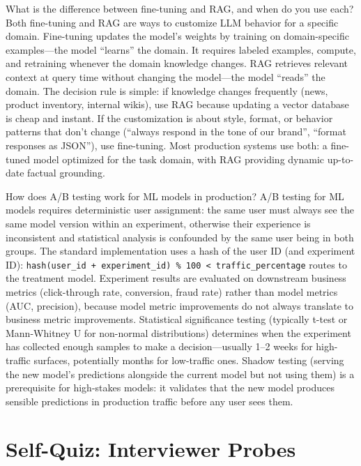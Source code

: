 \documentclass[11pt,a4paper]{article}
\begin{document}
\begin{curiobox}{What is the difference between fine-tuning and RAG, and when do you use each?}
Both fine-tuning and RAG are ways to customize LLM behavior for a specific domain. Fine-tuning updates the model's weights by training on domain-specific examples---the model ``learns'' the domain. It requires labeled examples, compute, and retraining whenever the domain knowledge changes. RAG retrieves relevant context at query time without changing the model---the model ``reads'' the domain. The decision rule is simple: if knowledge changes frequently (news, product inventory, internal wikis), use RAG because updating a vector database is cheap and instant. If the customization is about style, format, or behavior patterns that don't change (``always respond in the tone of our brand'', ``format responses as JSON''), use fine-tuning. Most production systems use both: a fine-tuned model optimized for the task domain, with RAG providing dynamic up-to-date factual grounding.
\end{curiobox}

\begin{curiobox}{How does A/B testing work for ML models in production?}
A/B testing for ML models requires deterministic user assignment: the same user must always see the same model version within an experiment, otherwise their experience is inconsistent and statistical analysis is confounded by the same user being in both groups. The standard implementation uses a hash of the user ID (and experiment ID): \texttt{hash(user\_id + experiment\_id) \% 100 < traffic\_percentage} routes to the treatment model. Experiment results are evaluated on downstream business metrics (click-through rate, conversion, fraud rate) rather than model metrics (AUC, precision), because model metric improvements do not always translate to business metric improvements. Statistical significance testing (typically t-test or Mann-Whitney U for non-normal distributions) determines when the experiment has collected enough samples to make a decision---usually 1--2 weeks for high-traffic surfaces, potentially months for low-traffic ones. Shadow testing (serving the new model's predictions alongside the current model but not using them) is a prerequisite for high-stakes models: it validates that the new model produces sensible predictions in production traffic before any user sees them.
\end{curiobox}

\newpage
\section{Self-Quiz: Interviewer Probes}
\end{document}
